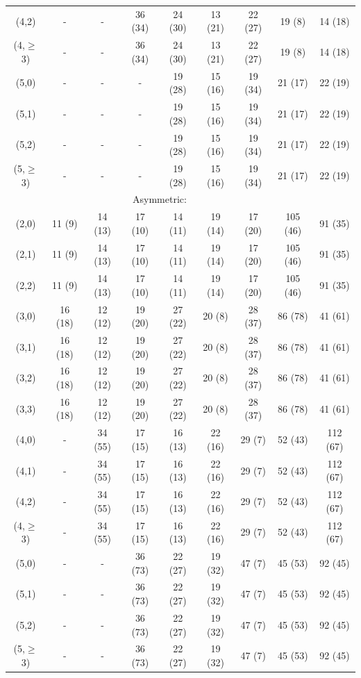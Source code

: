 \begin{table}[h!]
\begin{tabular}{ ccccccccc }
    (4,2)       & -       & -       & 36 (34) & 24 (30) & 13 (21) & 22 (27) & 19 (8)   & 14 (18)   \\
    (4,$\geq$3) & -       & -       & 36 (34) & 24 (30) & 13 (21) & 22 (27) & 19 (8)   & 14 (18)   \\
    (5,0)       & -       & -       & -       & 19 (28) & 15 (16) & 19 (34) & 21 (17)  & 22 (19)   \\
    (5,1)       & -       & -       & -       & 19 (28) & 15 (16) & 19 (34) & 21 (17)  & 22 (19)   \\
    (5,2)       & -       & -       & -       & 19 (28) & 15 (16) & 19 (34) & 21 (17)  & 22 (19)   \\
    (5,$\geq$3) & -       & -       & -       & 19 (28) & 15 (16) & 19 (34) & 21 (17)  & 22 (19)   \\
    \hline
    \multicolumn{8}{c}{Asymmetric:}                                                                \\
    (2,0)       & 11 (9)  & 14 (13) & 17 (10) & 14 (11) & 19 (14) & 17 (20) & 105 (46) & 91   (35) \\
    (2,1)       & 11 (9)  & 14 (13) & 17 (10) & 14 (11) & 19 (14) & 17 (20) & 105 (46) & 91   (35) \\
    (2,2)       & 11 (9)  & 14 (13) & 17 (10) & 14 (11) & 19 (14) & 17 (20) & 105 (46) & 91   (35) \\
    (3,0)       & 16 (18) & 12 (12) & 19 (20) & 27 (22) & 20 (8)  & 28 (37) & 86 (78)  & 41   (61) \\
    (3,1)       & 16 (18) & 12 (12) & 19 (20) & 27 (22) & 20 (8)  & 28 (37) & 86 (78)  & 41   (61) \\
    (3,2)       & 16 (18) & 12 (12) & 19 (20) & 27 (22) & 20 (8)  & 28 (37) & 86 (78)  & 41   (61) \\
    (3,3)       & 16 (18) & 12 (12) & 19 (20) & 27 (22) & 20 (8)  & 28 (37) & 86 (78)  & 41   (61) \\
    (4,0)       & -       & 34 (55) & 17 (15) & 16 (13) & 22 (16) & 29 (7)  & 52 (43)  & 112  (67) \\
    (4,1)       & -       & 34 (55) & 17 (15) & 16 (13) & 22 (16) & 29 (7)  & 52 (43)  & 112  (67) \\
    (4,2)       & -       & 34 (55) & 17 (15) & 16 (13) & 22 (16) & 29 (7)  & 52 (43)  & 112  (67) \\
    (4,$\geq$3) & -       & 34 (55) & 17 (15) & 16 (13) & 22 (16) & 29 (7)  & 52 (43)  & 112  (67) \\
    (5,0)       & -       & -       & 36 (73) & 22 (27) & 19 (32) & 47 (7)  & 45 (53)  & 92   (45) \\
    (5,1)       & -       & -       & 36 (73) & 22 (27) & 19 (32) & 47 (7)  & 45 (53)  & 92   (45) \\
    (5,2)       & -       & -       & 36 (73) & 22 (27) & 19 (32) & 47 (7)  & 45 (53)  & 92   (45) \\
    (5,$\geq$3) & -       & -       & 36 (73) & 22 (27) & 19 (32) & 47 (7)  & 45 (53)  & 92   (45) \\
    \hline
    \hline
  \end{tabular}
\end{table}

